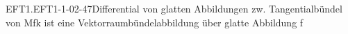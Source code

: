 \begin{EXA}{EFT1.EFT1-1-02-47}{Differential von glatten Abbildungen zw. Tangentialbündel von Mfk ist eine Vektorraumbündelabbildung über glatte Abbildung f}

\end{EXA}
